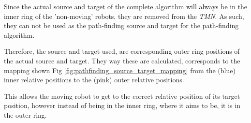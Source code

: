 Since the actual source and target of the complete algorithm will always be in the inner ring of the 'non-moving' robots, they are removed from the \textit{TMN}.  As such, they can not be used as the path-finding source and target for the path-finding algorithm. 

Therefore, the source and target used, are corresponding outer ring positions of the actual source and target. They way these are calculated, corresponds to the mapping shown Fig \ref{fig:pathfinding_source_target_mapping} from the (blue) inner relative positions to the (pink) outer relative positions.

This allows the moving robot to get to the correct relative position of its target position, however instead of being in the inner ring, where it aims to be, it is in the outer ring.



